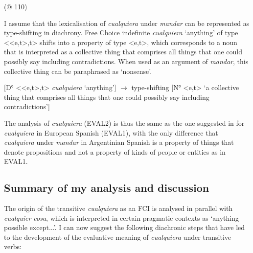     (@ 110)
\z

I assume that the lexicalisation of \textit{cualquiera} under \textit{mandar} can be represented as type-shifting in diachrony. Free Choice indefinite \textit{cualquiera} ‘anything’ of type <{}<e,t>,t> shifts into a property of type <e,t>, which corresponds to a noun that is interpreted as a collective thing that comprises all things that one could possibly say including contradictions. When used as an argument of \textit{mandar}, this collective thing can be paraphrased as ‘nonsense’.


\ea \label{ex:key:246} %
{[D° <{}<e,t>,t>} {\textit{cualquiera}}{ ‘anything’] $\rightarrow$ type-shifting [N° <e,t> ‘a collective thing that comprises all things that one could possibly say including contradictions’}]
\z

The analysis of \textit{cualquiera} (EVAL2) is thus the same as the one suggested in  for \textit{cualquiera} in European Spanish (EVAL1), with the only difference that \textit{cualquiera} under \textit{mandar} in Argentinian Spanish is a property of things that denote propositions and not a property of kinds of people or entities as in EVAL1.

\subsection{{Summary} {of} {my} {analysis} {and} {discussion}} \label{sec:4.5.4}

The origin of the transitive \textit{cualquiera} as an FCI is analysed in parallel with \textit{cualquier cosa}, which is interpreted in certain pragmatic contexts as ‘anything possible except...’. I can now suggest the following diachronic steps that have led to the development of the evaluative meaning of \textit{cualquiera} under transitive verbs:


